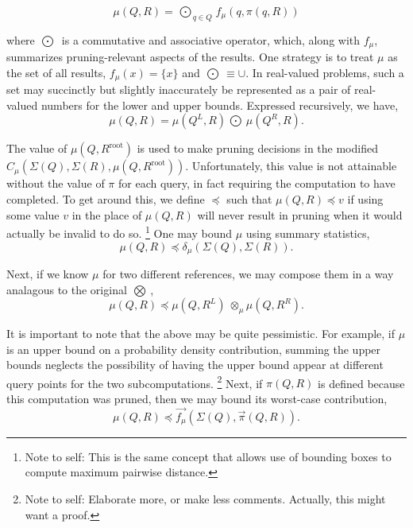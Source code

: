 \documentclass[times, leqno,twocolumn]{article}
\newcommand{\authornote}[1]{\footnote{Note to self: #1}}
\newcommand{\union}{\cup}
\newcommand{\kdroot}[1]{#1^{\text{root}}}
\newcommand{\kdleft}[1]{#1^{\!L}}
\newcommand{\kdright}[1]{#1^{\!R}}
\newcommand{\myOp}[1]{\mathop{\bigotimes\nolimits\!\!_{#1}}}
\newcommand{\myop}[1]{{\scriptstyle\:}\otimes_{\!#1}}
\newcommand{\myOutop}[1]{\mathop{\bigodot\nolimits\!\!_{#1}}}
\newcommand{\myoutop}[1]{\mathop{\bigodot\nolimits\!\!_{#1}}}
\newcommand{\letterqr}{\pi}
\newcommand{\inqr}{\pi}
\newcommand{\Opqr}{\myOp{\letterqr}}
\newcommand{\inqrv}{\vec{\pi}}
\newcommand{\lettermu}{\mu}
\newcommand{\inmu}{\mu}
\newcommand{\Outopmu}{\myOutop{\mu}}
\newcommand{\outopmu}{\myoutop{\mu}}
\newcommand{\opmu}{\myop{\mu}}
\newcommand{\fmu}{f_{\mu}}
\newcommand{\fmuv}{\vec{f_{\mu}}}
\newcommand{\deltamu}{\delta_{\mu}}
\newcommand{\canprunemu}{C_{\mu}}
\newcommand{\allowmu}{\preceq}
\newcommand{\outstat}{\Sigma}
\begin{document}
\begin{equation}
\inmu(Q, R) = \Outopmu_{q \in Q} \fmu(q, \inqr(q, R))
\label{eqn:defmu}
\end{equation}

\noindent where $\Outopmu$ is a commutative and associative operator, which, along with $\fmu$, summarizes pruning-relevant aspects of the results.
One strategy is to treat $\inmu$ as the set of all results, $\fmu(x) = \{x\}$ and $\Outopmu \equiv \union$.
In real-valued problems, such a set may succinctly but slightly inaccurately be represented as a pair of real-valued numbers for the lower and upper bounds.
Expressed recursively, we have,
\begin{equation}
\inmu(Q, R) = \inmu(\kdleft{Q}, R) \outopmu \inmu(\kdright{Q}, R).
\label{eqn:dividemu}
\end{equation}

The value of $\inmu(Q, \kdroot{R})$ is used to make pruning decisions in the modified $\canprunemu(\outstat(Q), \outstat(R), \inmu(Q, \kdroot{R}))$.
Unfortunately, this value is not attainable without the value of $\inqr$ for each query, in fact requiring the computation to have completed.
To get around this, we define $\allowmu$ such that $\inmu(Q,R) \allowmu v$ if using some value $v$ in the place of $\inmu(Q, R)$ will never result in pruning when it would actually be invalid to do so.
\authornote{This is the same concept that allows use of bounding boxes to compute maximum pairwise distance.}
One may bound $\inmu$ using summary statistics,
\begin{equation}
\inmu(Q, R) \allowmu \deltamu(\outstat(Q), \outstat(R)).
\label{eqn:approxmu}
\end{equation}

\noindent Next, if we know $\inmu$ for two different references, we may compose them in a way analagous to the original $\Opqr$,
\begin{equation}
\inmu(Q, R) \allowmu \inmu(Q, \kdleft{R}) \opmu \inmu(Q, \kdright{R}).
\label{eqn:combinemu}
\end{equation}

\noindent It is important to note that the above may be quite pessimistic.
For example, if $\inmu$ is an upper bound on a probability density contribution, summing the upper bounds neglects the possibility of having the upper bound appear at different query points for the two subcomputations.
\authornote{Elaborate more, or make less comments.  Actually, this might want a proof.}
Next, if $\pi(Q, R)$ is defined because this computation was pruned, then we may bound its worst-case contribution,
\begin{equation}
\inmu(Q, R) \allowmu \fmuv(\outstat(Q), \inqrv(Q, R)).
\label{eqn:pimu}
\end{equation}
\end{document}
